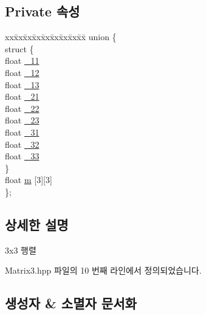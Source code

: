 \subsection*{Private 속성}
\begin{DoxyCompactItemize}
\item 
\begin{tabbing}
xx\=xx\=xx\=xx\=xx\=xx\=xx\=xx\=xx\=\kill
union \{\\
\>struct \{\\
\>\>float \hyperlink{classcpf_1_1_matrix3_aaa10854cee95f07b839a5541c3b7bee6}{\_11}\\
\>\>float \hyperlink{classcpf_1_1_matrix3_afa4bd5eff75ce61cb5d1bc7665afc933}{\_12}\\
\>\>float \hyperlink{classcpf_1_1_matrix3_aac0e85e7076116199a7705b12ed333c6}{\_13}\\
\>\>float \hyperlink{classcpf_1_1_matrix3_a863d1a67f95ebaa46846bd873766a5e0}{\_21}\\
\>\>float \hyperlink{classcpf_1_1_matrix3_a6d76d826dc4990d152aac577e6d6dee9}{\_22}\\
\>\>float \hyperlink{classcpf_1_1_matrix3_a13cb95b3ff96c8fb62663e9470121c68}{\_23}\\
\>\>float \hyperlink{classcpf_1_1_matrix3_adcc55d694d1f3de276b8444054515b9a}{\_31}\\
\>\>float \hyperlink{classcpf_1_1_matrix3_af5f440942582009a4249fde4c781c8a2}{\_32}\\
\>\>float \hyperlink{classcpf_1_1_matrix3_a98deb69c842744adece22e5f45d1e6d1}{\_33}\\
\>\} \\
\>float \hyperlink{classcpf_1_1_matrix3_a544955e219e5edd0c933f5e83dde9fac}{m} \mbox{[}3\mbox{]}\mbox{[}3\mbox{]}\\
\}; \\

\end{tabbing}\end{DoxyCompactItemize}


\subsection{상세한 설명}
3x3 행렬 

Matrix3.\+hpp 파일의 10 번째 라인에서 정의되었습니다.



\subsection{생성자 \& 소멸자 문서화}
\mbox{\label{classcpf_1_1_matrix3_a449a9e860e87c053355379869430cbb7}} 
